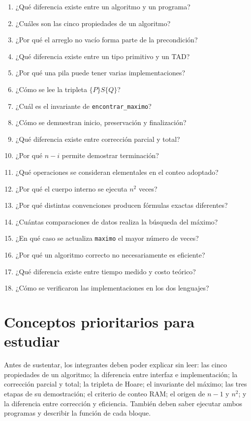 \documentclass[12pt,letterpaper]{article}
\newcommand{\codigo}[1]{\texttt{#1}}
\begin{document}
\begin{enumerate}
  \item ¿Qué diferencia existe entre un algoritmo y un programa?
  \item ¿Cuáles son las cinco propiedades de un algoritmo?
  \item ¿Por qué el arreglo no vacío forma parte de la precondición?
  \item ¿Qué diferencia existe entre un tipo primitivo y un TAD?
  \item ¿Por qué una pila puede tener varias implementaciones?
  \item ¿Cómo se lee la tripleta $\{P\}S\{Q\}$?
  \item ¿Cuál es el invariante de \codigo{encontrar\_maximo}?
  \item ¿Cómo se demuestran inicio, preservación y finalización?
  \item ¿Qué diferencia existe entre corrección parcial y total?
  \item ¿Por qué $n-i$ permite demostrar terminación?
  \item ¿Qué operaciones se consideran elementales en el conteo adoptado?
  \item ¿Por qué el cuerpo interno se ejecuta $n^2$ veces?
  \item ¿Por qué distintas convenciones producen fórmulas exactas diferentes?
  \item ¿Cuántas comparaciones de datos realiza la búsqueda del máximo?
  \item ¿En qué caso se actualiza \codigo{maximo} el mayor número de veces?
  \item ¿Por qué un algoritmo correcto no necesariamente es eficiente?
  \item ¿Qué diferencia existe entre tiempo medido y costo teórico?
  \item ¿Cómo se verificaron las implementaciones en los dos lenguajes?
\end{enumerate}

\section{Conceptos prioritarios para estudiar}

Antes de sustentar, los integrantes deben poder explicar sin leer: las cinco propiedades de un algoritmo; la diferencia entre interfaz e implementación; la corrección parcial y total; la tripleta de Hoare; el invariante del máximo; las tres etapas de su demostración; el criterio de conteo RAM; el origen de $n-1$ y $n^2$; y la diferencia entre corrección y eficiencia. También deben saber ejecutar ambos programas y describir la función de cada bloque.
\end{document}
